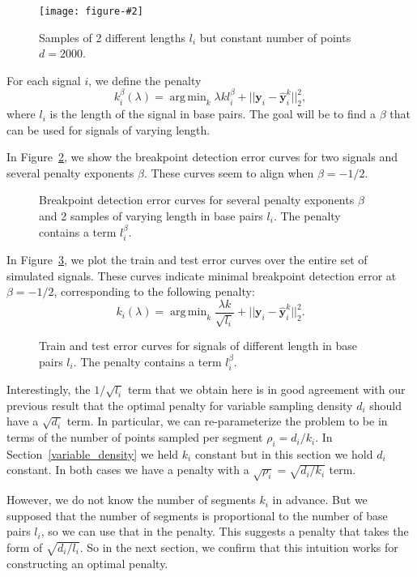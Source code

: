 \documentclass{article}
\newcommand{\fig}[3][H]{
  \begin{figure}[#1]
    \hskip -1cm
    
    \caption{#3}
    \label{fig:#2}
  \end{figure}
}
\newcommand{\figpdf}[3][H]{
  \begin{figure}[#1]
    \hskip -1cm
    \texttt{[image: figure-\#2]}
    \caption{#3}
    \label{fig:#2}
  \end{figure}
}
\DeclareMathOperator*{\argmin}{arg\,min}
\begin{document}
\figpdf{variable-breaks-constant-size}{Samples of 2 different lengths
  $l_i$ but constant number of points $d=2000$.}

\newpage

For each signal $i$, we define the penalty
\begin{equation}
  \label{eq:kstar_length}
  k_i^\beta(\lambda) = \argmin_k \lambda k l_i^\beta
+ ||\mathbf y_i - \mathbf{\hat y}_i^k||^2_2,
\end{equation}
where $l_i$ is the length of the signal in base pairs. The goal will
be to find a $\beta$ that can be used for signals of varying length.


In Figure~\ref{fig:variable-breaks-constant-size-berr}, we show
the breakpoint detection error curves for two signals and several
penalty exponents $\beta$.
These curves seem to align when $\beta=-1/2$.

\fig{variable-breaks-constant-size-berr}{Breakpoint detection error
  curves for several penalty exponents $\beta$ and 2 samples of
  varying length in base pairs $l_i$. The penalty contains a term
  $l_i^\beta$.}

\newpage

In Figure~\ref{fig:variable-breaks-constant-size-alpha}, we plot the
train and test error curves over the entire set of simulated signals.
These curves indicate minimal breakpoint detection error at
$\beta=-1/2$, corresponding to the following penalty:
\begin{equation}
  \label{eq:kstar_length_opt}
  k_i(\lambda) = \argmin_k \frac{\lambda k}{\sqrt{l_i}}
  + ||\mathbf y_i-\mathbf{\hat y}_i^k||^2_2.
\end{equation}




\fig{variable-breaks-constant-size-alpha}{Train and test error curves
  for signals of different length in base pairs $l_i$. The penalty
  contains a term
  $l_i^\beta$.}


Interestingly, the $1/\sqrt{l_i}$ term that we obtain here is in good
agreement with our previous result that the optimal penalty for
variable sampling density $d_i$ should have a $\sqrt{d_i}$ term. In
particular, we can re-parameterize the problem to be in terms of the
number of points sampled per segment $\rho_i=d_i/k_i$. In
Section~\ref{variable_density} we held $k_i$ constant but in this
section we hold $d_i$ constant. In both cases we have a penalty with a
$\sqrt{\rho_i}=\sqrt{d_i/k_i}$ term.

However, we do not know the number of segments $k_i$ in advance. But
we supposed that the number of segments is proportional to the number
of base pairs $l_i$, so we can use that in the penalty. This suggests
a penalty that takes the form of $\sqrt{d_i/l_i}$. So in the next
section, we confirm that this intuition works for constructing an
optimal penalty.
\end{document}
